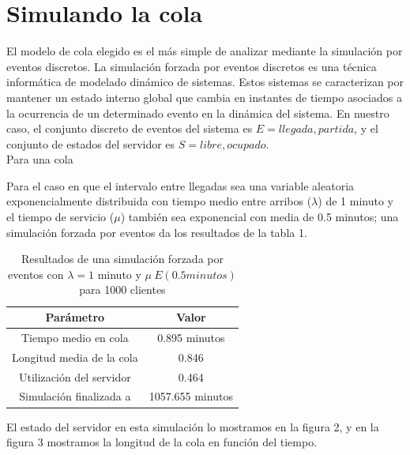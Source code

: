 \documentclass[10pt,journal,compsoc]{IEEEtran}
\begin{document}
\section{Simulando la cola} %
El modelo de cola elegido es el m\'as simple de analizar mediante la simulaci\'on por eventos discretos.
La simulaci\'on forzada por eventos discretos es una t\'ecnica inform\'atica de modelado din\'amico de
sistemas. Estos sistemas se caracterizan por mantener un estado interno global que cambia en instantes
de tiempo asociados a la ocurrencia de un determinado evento en la din\'amica del sistema. En nuestro
caso, el conjunto discreto de eventos del sistema es $E={llegada, partida}$, y el conjunto de estados
del servidor es $S={libre, ocupado}$.\\
Para una cola 

Para el caso en que el intervalo entre llegadas sea una variable aleatoria exponencialmente distribuida
con tiempo medio entre arribos ($\lambda$) de 1 minuto y el tiempo de servicio ($\mu$) tambi\'en sea 
exponencial con media de 0.5 minutos; una simulaci\'on forzada por eventos da los resultados de la tabla 1.\\

\begin{table}[!t]
\renewcommand{\arraystretch}{1.3}
\centering
\begin{tabular}{c c}
\hline
\hline
Par\'ametro  				&	Valor			\\
\hline
Tiempo medio en cola		&	0.895 minutos	\\
Longitud media de la cola	&	0.846			\\
Utilizaci\'on del servidor	&	0.464			\\
Simulaci\'on finalizada a	&	1057.655 minutos\\
\hline
\hline
\end{tabular}
\label{tab:sim}
\caption{Resultados de una simulaci\'on forzada por eventos con $\lambda = 1$ minuto y $\mu~E(0.5 minutos)$ para 1000 clientes}
\end{table}

El estado del servidor en esta simulaci\'on lo mostramos en la figura 2, y en la figura 3 mostramos
la longitud de la cola en funci\'on del tiempo.
\end{document}
